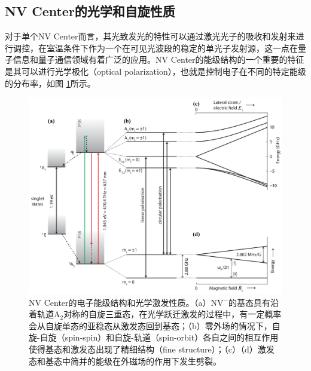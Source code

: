 \documentclass[type = bachelor]{whu-thesis}
\begin{document}
\subsection{NV Center的光学和自旋性质}
对于单个NV Center而言，其光致发光的特性可以通过激光光子的吸收和发射来进行调控，在室温条件下作为一个在可见光波段的稳定的单光子发射源，这一点在量子信息和量子通信领域有着广泛的应用。NV Center的能级结构的一个重要的特征是其可以进行光学极化（optical polarization），也就是控制电子在不同的特定能级的分布率，如图 \ref{fig: Optical Properties}所示。

\begin{figure}
  \centering
  \includegraphics[width=1.0\textwidth]{figures/Chapter 1/Optical Properties.png}
  \caption[NV Center的电子能级结构和光学激发性质]{NV Center的电子能级结构和光学激发性质。（a）NV$^-$的基态具有沿着轨道A$_2$对称的自旋三重态，在光学跃迁激发的过程中，有一定概率会从自旋单态的亚稳态从激发态回到基态；（b）零外场的情况下，自旋-自旋（spin-spin）和自旋-轨道（spin-orbit）各自之间的相互作用使得基态和激发态出现了精细结构（fine structure）；（c）（d）激发态和基态中简并的能级在外磁场的作用下发生劈裂。}
  \label{fig: Optical Properties}
\end{figure}
\end{document}
